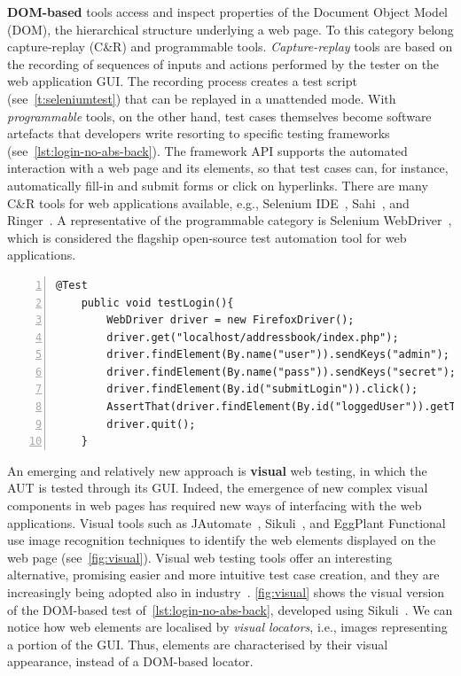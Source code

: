 \textbf{DOM-based} tools access and inspect properties of the Document Object Model (DOM), the hierarchical structure underlying a web page. To this category belong capture-replay (C\&R) and programmable tools. \textit{Capture-replay} tools are based on the recording of sequences of inputs and actions performed by the tester on the web application GUI. The recording process creates a test script (see~\autoref{t:seleniumtest}) that can be replayed in a unattended mode. 
With \textit{programmable} tools, on the other hand, test cases themselves become software artefacts that developers write 
resorting to specific testing frameworks (see~\autoref{lst:login-no-abs-back}). The framework API supports the automated interaction with a web page and its elements, so that test cases can, for instance, automatically fill-in and submit forms or click on hyperlinks. There are many C\&R tools for web applications available, e.g., Selenium IDE~\cite{selenium}, Sahi~\cite{sahi}, and Ringer~\cite{ringer}. A representative of the programmable category is Selenium WebDriver~\cite{selenium}, which is considered the flagship open-source test automation tool for web applications.

\begin{lstlisting}[firstnumber=1, xleftmargin=6ex, float=t,numbers=left,caption={An example of programmable automated test (Selenium WebDriver)},label=lst:login-no-abs-back]
	@Test
	public void testLogin(){
		WebDriver driver = new FirefoxDriver();
		driver.get("localhost/addressbook/index.php");
		driver.findElement(By.name("user")).sendKeys("admin");
		driver.findElement(By.name("pass")).sendKeys("secret");
		driver.findElement(By.id("submitLogin")).click();
		AssertThat(driver.findElement(By.id("loggedUser")).getText(), is("(admin)"));
		driver.quit();
	}
\end{lstlisting}

An emerging and relatively new approach is \textbf{visual} web testing, in which the AUT is tested through its GUI. Indeed, the emergence of new complex visual components in web pages has required new ways of interfacing with the web applications. Visual tools such as JAutomate~\cite{Alegroth2013jat}, Sikuli~\cite{Sikuli}, and EggPlant Functional~\cite{eggplant} use image recognition techniques to identify the web elements displayed on the web page (see~\autoref{fig:visual}). Visual web testing tools offer an interesting alternative, promising easier and more intuitive test case creation, and they are increasingly being adopted also in industry~\cite{Alegroth2013jat}. 
\autoref{fig:visual} shows the visual version of the DOM-based test of~\autoref{lst:login-no-abs-back}, developed using Sikuli~\cite{Sikuli}. We can notice how web elements are localised by \textit{visual locators}, i.e., images representing a portion of the GUI. Thus, elements are characterised by their visual appearance, instead of a DOM-based locator.

